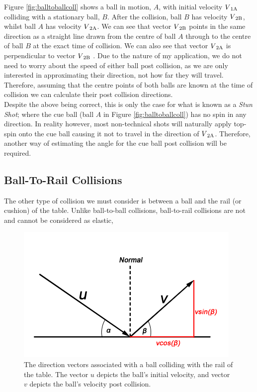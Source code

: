 \documentclass[ %
                author={Finn Alexander Wilkinson},
                supervisor={Dr. Andrew Calway},
                degree={MEng},
                title={\centering A Mixed Reality Aim Assistant for Pool and Snooker},
                subtitle={},
                type={Enterprise},
                year={2021} ]{dissertation}
\begin{document}
Figure \ref{fig:balltoballcoll} shows a ball in motion, \(A\), with initial velocity \(V\textsubscript{1A}\) colliding with a stationary ball, \(B\). After the collision, ball \(B\) has velocity \(V\textsubscript{2B}\), whilst ball \(A\) has velocity \(V\textsubscript{2A}\). We can see that vector \(V\textsubscript{2B}\) points in the same direction as a straight line drawn from the centre of ball \(A\) through to the centre of ball \(B\) at the exact time of collision. We can also see that vector \(V\textsubscript{2A}\) is perpendicular to vector \(V\textsubscript{2B}\) \cite{PhysicsOfBilliards}. Due to the nature of my application, we do not need to worry about the speed of either ball post collision, as we are only interested in approximating their direction, not how far they will travel. Therefore, assuming that the centre points of both balls are known at the time of collision we can calculate their post collision directions.\\

Despite the above being correct, this is only the case for what is known as a \textit{Stun Shot}; where the cue ball (ball \(A\) in Figure \ref{fig:balltoballcoll}) has no spin in any direction. In reality however, most non-technical shots will naturally apply top-spin onto the cue ball causing it not to travel in the direction of \(V\textsubscript{2A}\). Therefore, another way of estimating the angle for the cue ball post collision will be required. 

\subsection{Ball-To-Rail Collisions}
The other type of collision we must consider is between a ball and the rail (or cushion) of the table. Unlike ball-to-ball collisions, ball-to-rail collisions are not and cannot be considered as elastic, 


\begin{figure}[h!]
    \centering
    \includegraphics[scale = 0.5]{Images/Ball-Cushion-Collision.png}
    \caption{The direction vectors associated with a ball colliding with the rail of the table. The vector \(u\) depicts the ball's initial velocity, and vector \(v\) depicts the ball's velocity post collision.}
    \label{fig:ballToRailColl}
\end{figure}
\end{document}
